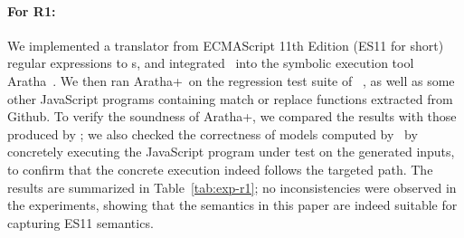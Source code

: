%

\paragraph{For \textbf{R1}:} We implemented a translator from ECMAScript 11th Edition (ES11 for short) regular
expressions to {\regexp}s, and integrated \ostrich\ into the symbolic
execution tool Aratha~\cite{aratha}. We then ran Aratha+\ostrich\ on
the regression test suite of \expose{}~\cite{DBLP:conf/spin/LoringMK17},
as well as some other JavaScript programs containing match or replace
functions extracted from Github. To verify the soundness of
Aratha+\ostrich, we compared the results with those produced by
\expose{}; we also checked the correctness of models computed by
\ostrich\ by concretely executing the JavaScript program under test on
the generated inputs, to confirm that the concrete execution indeed
follows the targeted path. The results are summarized in Table~\ref{tab:exp-r1};
no inconsistencies were observed in the experiments, showing that the
semantics in this paper are indeed suitable for capturing ES11
semantics.

